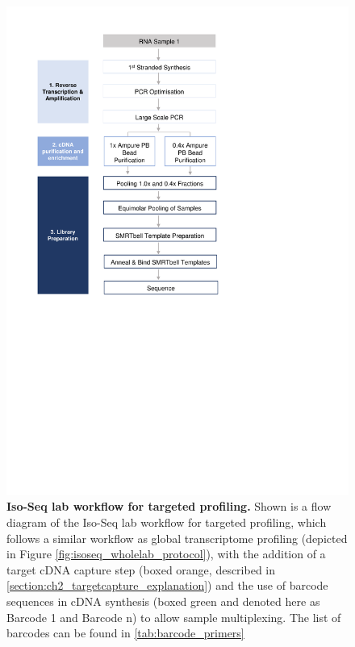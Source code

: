 \begin{figure}[]
	\begin{center}
		\includegraphics[page=2,trim={1cm 11cm 1cm 1cm},clip,scale = 0.8]{Figures/ProjectDevelopment_Figures.pdf}
	\end{center}
	\captionsetup{width=0.95\textwidth}
	\caption[Iso-Seq lab workflow for targeted profiling]%
	{\textbf{Iso-Seq lab workflow for targeted profiling.} Shown is a flow diagram of the Iso-Seq lab workflow for targeted profiling, which follows a similar workflow as global transcriptome profiling (depicted in Figure \ref{fig:isoseq_wholelab_protocol}), with the addition of a target cDNA capture step (boxed orange, described in \cref{section:ch2_targetcapture_explanation}) and the use of barcode sequences in cDNA synthesis (boxed green and denoted here as Barcode 1 and Barcode n) to allow sample multiplexing. The list of barcodes can be found in \cref{tab:barcode_primers}}
	\label{fig:isoseq_targetedlab_protocol}
\end{figure}

